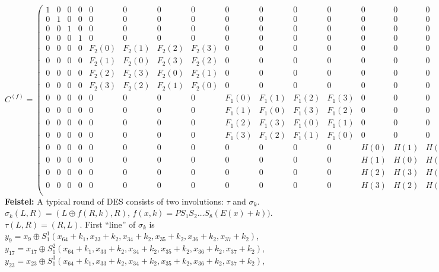 $$C^{(f)}=
\left(
\begin{array}{cccc|cccc|cccc|cccc}
1 & 0 & 0 & 0 & 0 & 0 & 0 & 0 & 0 & 0 & 0 & 0 & 0 & 0 & 0 & 0 \\
0 & 1 & 0 & 0 & 0 & 0 & 0 & 0 & 0 & 0 & 0 & 0 & 0 & 0 & 0 & 0 \\
0 & 0 & 1 & 0 & 0 & 0 & 0 & 0 & 0 & 0 & 0 & 0 & 0 & 0 & 0 & 0 \\
0 & 0 & 0 & 1 & 0 & 0 & 0 & 0 & 0 & 0 & 0 & 0 & 0 & 0 & 0 & 0 \\
\hline
0 & 0 & 0 & 0 &  F_2(0) &  F_2(1) &  F_2(2) &  F_2(3) & 0 & 0 & 0 & 0 & 0 & 0 & 0 & 0 \\
0 & 0 & 0 & 0 &  F_2(1) &  F_2(0) &  F_2(3) &  F_2(2) & 0 & 0 & 0 & 0 & 0 & 0 & 0 & 0 \\
0 & 0 & 0 & 0 &  F_2(2) &  F_2(3) &  F_2(0) &  F_2(1) & 0 & 0 & 0 & 0 & 0 & 0 & 0 & 0 \\
0 & 0 & 0 & 0 &  F_2(3) &  F_2(2) &  F_2(1) &  F_2(0) & 0 & 0 & 0 & 0 & 0 & 0 & 0 & 0 \\
\hline
0 & 0 & 0 & 0 & 0 & 0 & 0 & 0 &  F_1(0) &  F_1(1) &  F_1(2) &  F_1(3) & 0 & 0 & 0 & 0 \\
0 & 0 & 0 & 0 & 0 & 0 & 0 & 0 &  F_1(1) &  F_1(0) &  F_1(3) &  F_1(2) & 0 & 0 & 0 & 0 \\
0 & 0 & 0 & 0 & 0 & 0 & 0 & 0 &  F_1(2) &  F_1(3) &  F_1(0) &  F_1(1) & 0 & 0 & 0 & 0 \\
0 & 0 & 0 & 0 & 0 & 0 & 0 & 0 &  F_1(3) &  F_1(2) &  F_1(1) &  F_1(0) & 0 & 0 & 0 & 0 \\
\hline
0 & 0 & 0 & 0 & 0 & 0 & 0 & 0 & 0 & 0 & 0 & 0 &  H(0) &  H(1) &  H(2) &  H(3) \\
0 & 0 & 0 & 0 & 0 & 0 & 0 & 0 & 0 & 0 & 0 & 0 &  H(1) &  H(0) &  H(3) &  H(2) \\
0 & 0 & 0 & 0 & 0 & 0 & 0 & 0 & 0 & 0 & 0 & 0 &  H(2) &  H(3) &  H(0) &  H(1) \\
0 & 0 & 0 & 0 & 0 & 0 & 0 & 0 & 0 & 0 & 0 & 0 &  H(3) &  H(2) &  H(1) &  H(0) \\
\end{array}
\right)$$
{\bf Feistel:}
A typical round of DES consists of two involutions: $\tau$ and $\sigma_k$.
$\sigma_k (L,R)= (L \oplus f(R,k), R)$, $f(x,k)= P S_1 S_2 \ldots S_8 (E(x)+k))$.
$\tau(L,R)= (R,L)$.
First ``line'' of $\sigma_k$ is 
$y_9= x_9 \oplus S_1^1(x_{64}+k_1,x_{33}+k_2,x_{34}+k_2, x_{35}+k_2, x_{36}+k_2, x_{37}+k_2)$,
$y_{17}= 
x_{17} \oplus S_1^2(x_{64}+k_1,x_{33}+k_2,x_{34}+k_2,x_{35}+k_2, x_{36}+k_2, x_{37}+k_2)$,
$y_{23}= 
x_{23} \oplus S_1^3(x_{64}+k_1,x_{33}+k_2,x_{34}+k_2,x_{35}+k_2, x_{36}+k_2, x_{37}+k_2)$,
